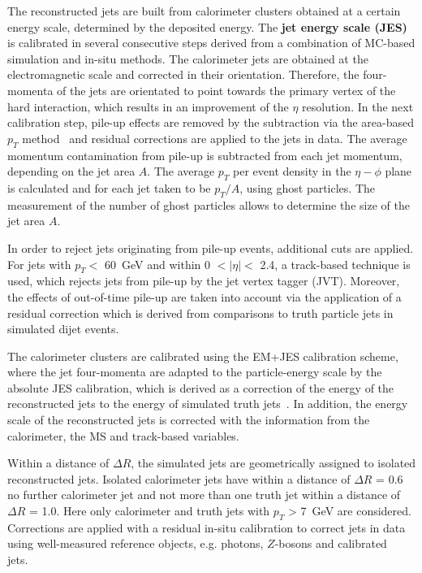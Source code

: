  The reconstructed jets are built from calorimeter clusters obtained at a certain energy scale, determined by the deposited energy. The \textbf{jet energy scale (JES)} is calibrated in several consecutive steps derived from a combination of MC-based simulation and in-situ methods. The calorimeter jets are obtained at the electromagnetic scale  and corrected in their orientation. Therefore, the four-momenta of the jets are orientated to point towards the primary vertex of the hard interaction, which results in an improvement of the $\eta$ resolution.  In the next calibration step, pile-up effects are removed  by the subtraction via the area-based $p_T$ method~\cite{Cacciari:2007fd} and  residual corrections are applied to the  jets in data.  The  average momentum contamination from pile-up is subtracted from each jet momentum, depending on the jet area $A$. The average $p_T$ per event density in the $\eta-\phi$ plane is calculated and for each jet taken to be $p_T/A$, using ghost particles. The measurement of the number of ghost particles  allows to determine the size of the  jet area $A$.~\cite{Aaboud:2017jcu}

 In order to reject jets originating from pile-up events,  additional cuts are applied. For jets with  $p_T <$ 60~GeV and within  0 $<\mid \eta \mid<$ 2.4,  a track-based technique is used, which rejects  jets from pile-up by the jet vertex tagger (JVT). Moreover, the effects of out-of-time pile-up are taken into account via the application of  a residual correction  which is derived from comparisons to truth particle jets in simulated dijet events.~\cite{Aad:2015ina}


 The calorimeter clusters are calibrated using the EM+JES calibration scheme, where the jet four-momenta are adapted to the particle-energy scale by the absolute JES calibration, which is derived as a correction of the energy of the reconstructed jets to the energy of simulated truth jets~\cite{Aad:2014bia}.
 In addition, the energy scale of the reconstructed jets is corrected with the information from the calorimeter, the MS and track-based variables.
 
 
 
  Within a distance of $\Delta R$, the simulated jets are geometrically assigned to isolated reconstructed jets. Isolated calorimeter jets have within a distance of $\Delta R$ = 0.6 no further calorimeter jet  and not more than one truth jet within a distance of $\Delta R$ = 1.0.  Here only calorimeter and truth jets with  $p_T$ > 7~GeV are considered. Corrections are applied with a residual in-situ calibration to correct jets in data using well-measured reference objects, e.g.  photons, $Z$-bosons and calibrated jets.~\cite{Aaboud:2017jcu}
  
